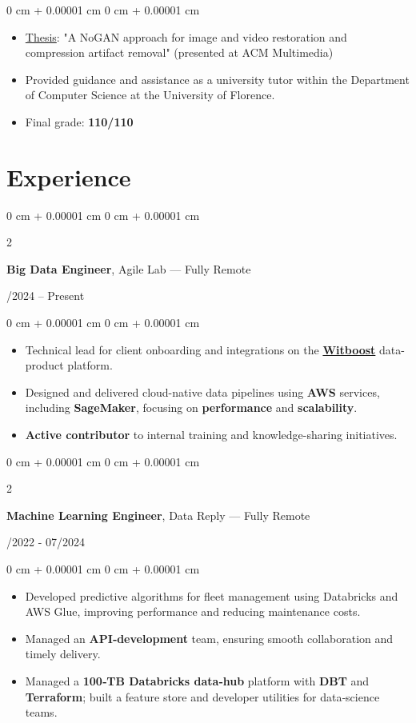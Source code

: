 \documentclass[10pt, letterpaper]{article}
\newenvironment{highlights}{
    \begin{itemize}[
        topsep=0.10 cm,
        parsep=0.10 cm,
        partopsep=0pt,
        itemsep=0pt,
        leftmargin=0 cm + 10pt
    ]
}{
    \end{itemize}
} %
\newenvironment{onecolentry}{
    \begin{adjustwidth}{
        0 cm + 0.00001 cm
    }{
        0 cm + 0.00001 cm
    }
}{
    \end{adjustwidth}
} %
\newenvironment{twocolentry}[2][]{
    \onecolentry
    \def\secondColumn{#2}
    \setcolumnwidth{\fill, 4.5 cm}
    \begin{paracol}{2}
}{
    \switchcolumn \raggedleft \secondColumn
    \end{paracol}
    \endonecolentry
} %
\let\hrefWithoutArrow\href
\begin{document}
\vspace{0.10 cm}
\begin{onecolentry}
    \begin{highlights}
        \item {\hrefWithoutArrow{https://ieeexplore.ieee.org/abstract/document/9413095}{Thesis}}: "A NoGAN approach for image and video restoration and compression artifact removal" (presented at ACM Multimedia)
        \item Provided guidance and assistance as a university tutor within the Department of Computer Science at the University of Florence.
        \item Final grade: \textbf{110/110}
    \end{highlights}
\end{onecolentry}

    \section{Experience}

\begin{twocolentry}{09/2024 – Present}
    \textbf{Big Data Engineer}, Agile Lab — Fully Remote
\end{twocolentry}
\begin{onecolentry}
    \begin{highlights}
        \item Technical lead for client onboarding and integrations on the {\hrefWithoutArrow{https://witboost.com/}{\textbf{Witboost}}} data-product platform.
        \item Designed and delivered cloud-native data pipelines using \textbf{AWS} services, including \textbf{SageMaker}, focusing on \textbf{performance} and \textbf{scalability}.
        \item \textbf{Active contributor} to internal training and knowledge-sharing initiatives.
    \end{highlights}
\end{onecolentry}

\vspace{0.2 cm}

\begin{twocolentry}{05/2022 - 07/2024}
    \textbf{Machine Learning Engineer}, Data Reply — Fully Remote
\end{twocolentry}
\begin{onecolentry}
    \begin{highlights}
        \item Developed predictive algorithms for fleet management using Databricks and AWS Glue, improving performance and reducing maintenance costs.
        \item Managed an \textbf{API‑development} team, ensuring smooth collaboration and timely delivery.
        \item Managed a \textbf{100‑TB Databricks data‑hub} platform with \textbf{DBT} and \textbf{Terraform}; built a feature store and developer utilities for data‑science teams.
    \end{highlights}
\end{onecolentry}
\end{document}
